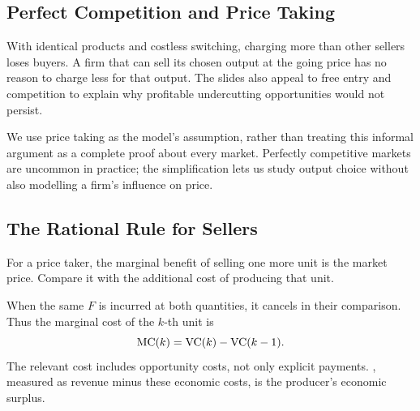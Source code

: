 \subsection{Perfect Competition and Price Taking}
With identical products and costless switching, charging more than other
sellers loses buyers. A firm that can sell its chosen output at the going
price has no reason to charge less for that output. The slides also appeal
to free entry and competition to explain why profitable undercutting
opportunities would not persist.

We use price taking as the model's assumption, rather than treating this
informal argument as a complete proof about every market. Perfectly
competitive markets are uncommon in practice; the simplification lets us
study output choice without also modelling a firm's influence on price.

\subsection{The Rational Rule for Sellers}
For a price taker, the marginal benefit of selling one more unit is the
market price. Compare it with the additional cost of producing that unit.

When the same $F$ is incurred at both quantities, it cancels in their
comparison. Thus the marginal cost of the $k$-th unit is
\[
\operatorname{MC}(k)=\operatorname{VC}(k)-\operatorname{VC}(k-1).
\]
The relevant cost includes opportunity costs, not only explicit payments.
, measured as revenue minus these economic costs, is the
producer's economic surplus.

